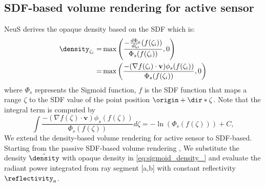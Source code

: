 \subsection{SDF-based volume rendering for active sensor}\label{sec:sdf_active}
NeuS\cite{wang2021neus} derives the opaque density based on the SDF which is:
\begin{equation}
\begin{split}
\density_{\zeta_i} =&  \max\left(\frac{-\frac{d\Phi_s}{d\zeta_i}(f(\zeta_i))}{\Phi_s(f(\zeta_i))},0\right)\\
                  =& \max\left(\frac{-(\nabla f(\zeta_i)\cdot \mathbf{v})\phi_s(f(\zeta_i))}{\Phi_s(f(\zeta_i))}, 0\right)
\end{split}
\label{eq:sigmoid_density_}
\end{equation}
where $\Phi_s$ represents the Sigmoid function, $f$ is the SDF function that maps a range $\zeta$ to the SDF value of the point position $\origin + \dir * \zeta$. Note that the integral term is computed by
\begin{equation}
\int \frac{-(\nabla f(\zeta)\cdot \mathbf{v})\phi_s(f(\zeta))}{\Phi_s(f(\zeta))}d\zeta = -\ln(\Phi_s(f(\zeta))) + C,
\label{eq:intergration_density}
\end{equation}
We extend the density-based volume rendering for active sensor to SDF-based. Starting from the passive SDF-based volume rendering \cite{wang2021neus}, We substitute the density $\tilde{\density}$ with opaque density in \ref{eq:sigmoid_density_}
and evaluate the radiant power integrated from ray segment [a,b] with constant reflectivity $\reflectivity_a$.


